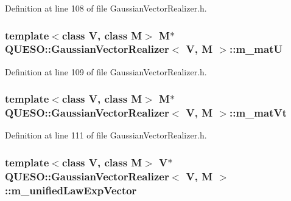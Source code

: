 Definition at line 108 of file Gaussian\-Vector\-Realizer.\-h.

\hypertarget{class_q_u_e_s_o_1_1_gaussian_vector_realizer_a62aebd74fe00824ceed9724b8c41cfa7}{
\subsubsection[{m\-\_\-mat\-U}]{\setlength{\rightskip}{0pt plus 5cm}template$<$class V, class M$>$ M$\ast$ {\bf Q\-U\-E\-S\-O\-::\-Gaussian\-Vector\-Realizer}$<$ V, M $>$\-::m\-\_\-mat\-U\hspace{0.3cm}{\ttfamily [private]}}}\label{class_q_u_e_s_o_1_1_gaussian_vector_realizer_a62aebd74fe00824ceed9724b8c41cfa7}


Definition at line 109 of file Gaussian\-Vector\-Realizer.\-h.

\hypertarget{class_q_u_e_s_o_1_1_gaussian_vector_realizer_aa121afe8cf67cea2a52552b4d12d57b8}{
\subsubsection[{m\-\_\-mat\-Vt}]{\setlength{\rightskip}{0pt plus 5cm}template$<$class V, class M$>$ M$\ast$ {\bf Q\-U\-E\-S\-O\-::\-Gaussian\-Vector\-Realizer}$<$ V, M $>$\-::m\-\_\-mat\-Vt\hspace{0.3cm}{\ttfamily [private]}}}\label{class_q_u_e_s_o_1_1_gaussian_vector_realizer_aa121afe8cf67cea2a52552b4d12d57b8}


Definition at line 111 of file Gaussian\-Vector\-Realizer.\-h.

\hypertarget{class_q_u_e_s_o_1_1_gaussian_vector_realizer_ae1e6e0b9c268ced4a2192a9bcbd37668}{
\subsubsection[{m\-\_\-unified\-Law\-Exp\-Vector}]{\setlength{\rightskip}{0pt plus 5cm}template$<$class V, class M$>$ V$\ast$ {\bf Q\-U\-E\-S\-O\-::\-Gaussian\-Vector\-Realizer}$<$ V, M $>$\-::m\-\_\-unified\-Law\-Exp\-Vector\hspace{0.3cm}{\ttfamily [private]}}}\label{class_q_u_e_s_o_1_1_gaussian_vector_realizer_ae1e6e0b9c268ced4a2192a9bcbd37668}


